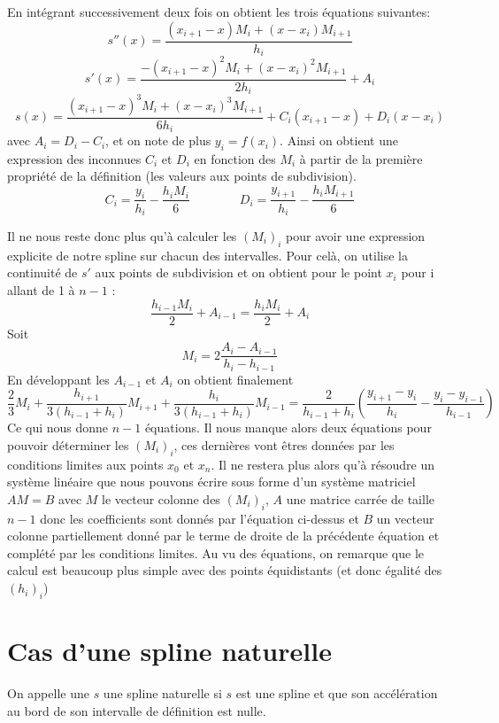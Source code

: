 En intégrant successivement deux fois on obtient les trois équations suivantes:
\[
s''(x) = \frac{(x_{i+1} - x)M_i + (x - x_i)M_{i+1}}{h_i}
\]
\[
s'(x) = \frac{-(x_{i+1} - x)^{2}M_i + (x - x_i)^{2}M_{i+1}}{2h_i} + A_i
\]
\[
s(x) = \frac{(x_{i+1} - x)^{3}M_i + (x - x_i)^{3}M_{i+1}}{6h_i} + C_i(x_{i+1}-x) +D_i(x-x_i)
\]
avec $A_i = D_i - C_i$, et on note de plus $y_i = f(x_i)$. Ainsi on obtient une expression des inconnues $C_i$ et $D_i$
en fonction des $M_i$ à partir de la première propriété de la définition (les valeurs aux points de subdivision).
\[
C_i = \frac{y_i}{h_i} - \frac{h_iM_i}{6} \qquad \qquad D_i = \frac{y_{i+1}}{h_i} - \frac{h_iM_{i+1}}{6}
\]

Il ne nous reste donc plus qu'à calculer les $(M_i)_i$ pour avoir une expression explicite de notre spline sur chacun des intervalles.
Pour celà, on utilise la continuité de $s'$ aux points de subdivision et on obtient pour le point $x_{i}$ pour i allant de 1 à $n-1$ :
\[
\frac{h_{i-1}M_{i}}{2} + A_{i-1} = \frac{h_{i}M_{i}}{2} + A_{i}
\]
Soit
\[
{M_{i}} = 2\frac{A_{i}-A_{i-1}}{h_{i}-h_{i-1}}
\]
En développant les $A_{i-1}$ et $A_{i}$ on obtient finalement
\[
\frac{2}{3}M_{i} +\frac{h_{i+1}}{3(h_{i-1}+h_{i})}M_{i+1}+\frac{h_{i}}{3(h_{i-1}+h_{i})}M_{i-1} = \frac{2}{h_{i-1}+h_{i}} (\frac{y_{i+1} - y_{i}}{h_{i}} - \frac{y_{i} - y_{i-1}}{h_{i-1}})
\]
Ce qui nous donne $n-1$ équations.
Il nous manque alors deux équations pour pouvoir déterminer les $(M_i)_i$,
ces dernières vont êtres données par les conditions limites aux points $x_0$ et $x_n$.
Il ne restera plus alors qu'à résoudre un système linéaire que nous pouvons écrire sous forme d'un système matriciel $AM = B$
avec $M$ le vecteur colonne des $(M_i)_i$, $A$ une matrice carrée de taille $n-1$ donc les coefficients sont donnés par l'équation ci-dessus et $B$ 
un vecteur colonne partiellement donné par le terme de droite de la précédente équation et complété par les conditions limites.
Au vu des équations, on remarque que le calcul est beaucoup plus simple avec des points équidistants (et donc égalité des $(h_i)_i$)

\section{Cas d'une spline naturelle}

\begin{definition}
On appelle une $s$ une spline naturelle si $s$ est une spline et que
son accélération au bord de son intervalle de définition est nulle.
\end{definition}

